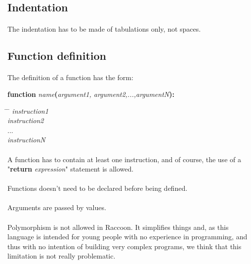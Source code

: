 \documentclass[12pt,a4paper]{article}
\begin{document}
\subsection{Indentation}
\paragraph{}
The indentation has to be made of tabulations only, not spaces.

\subsection{Function definition}

\paragraph{}
The definition of a function has the form:

\begin{center}
\textbf{function} \textit{name}\textbf{(}\textit{argument1, argument2,...,argumentN}\textbf{):}
\end{center}
\begin{tabbing}
\hspace{3.5cm} \= \hspace{2cm} \= \kill
   \> \textit{instruction1} \\
   \> \textit{instruction2} \\
   \> ... \\
   \> \textit{instructionN} \\
\end{tabbing}

\paragraph{}
A function has to contain at least one instruction, and of course, the use of a "\textbf{return} \textit{expression}" statement is allowed.

\paragraph{}
Functions doesn't need to be declared before being defined.

\paragraph{}
Arguments are passed by values.

\paragraph{}
Polymorphism is not allowed in Raccoon. It simplifies things and, as this language is intended for young people with no experience in programming, and thus with no intention of building very complex programs, we think that this limitation is not really problematic. 
\end{document}
